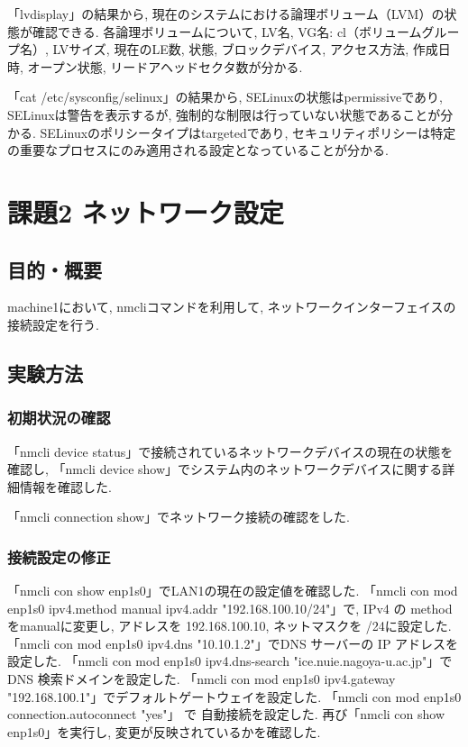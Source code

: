\documentclass{ltjsarticle} %
\begin{document}
「lvdisplay」の結果から, 現在のシステムにおける論理ボリューム（LVM）の状態が確認できる. 
各論理ボリュームについて, LV名, VG名: cl（ボリュームグループ名）, LVサイズ, 現在のLE数, 
状態, ブロックデバイス, アクセス方法, 作成日時, オープン状態, リードアヘッドセクタ数が分かる. 

「cat /etc/sysconfig/selinux」の結果から, SELinuxの状態はpermissiveであり, SELinuxは警告を表示するが, 
強制的な制限は行っていない状態であることが分かる. 
SELinuxのポリシータイプはtargetedであり, セキュリティポリシーは特定の重要なプロセスにのみ適用される設定となっていることが分かる. 

\section{課題2 ネットワーク設定}

\subsection{目的・概要}
machine1において, nmcliコマンドを利用して, ネットワークインターフェイスの接続設定を行う.

\subsection{実験方法}

\subsubsection{初期状況の確認}
「nmcli device status」で接続されているネットワークデバイスの現在の状態を確認し, 
「nmcli device show」でシステム内のネットワークデバイスに関する詳細情報を確認した. 

「nmcli connection show」でネットワーク接続の確認をした. 

\subsubsection{接続設定の修正}
「nmcli con show enp1s0」でLAN1の現在の設定値を確認した. 
「nmcli con mod enp1s0 ipv4.method manual ipv4.addr "192.168.100.10/24"」で, 
IPv4 の method をmanualに変更し, アドレスを 192.168.100.10, ネットマスクを /24に設定した. 
「nmcli con mod enp1s0 ipv4.dns "10.10.1.2"」でDNS サーバーの IP アドレスを設定した. 
「nmcli con mod enp1s0 ipv4.dns-search "ice.nuie.nagoya-u.ac.jp"」でDNS 検索ドメインを設定した. 
「nmcli con mod enp1s0 ipv4.gateway "192.168.100.1"」でデフォルトゲートウェイを設定した. 
「nmcli con mod enp1s0 connection.autoconnect "yes"」 で 自動接続を設定した. 
再び「nmcli con show enp1s0」を実行し, 変更が反映されているかを確認した. 
\end{document}
